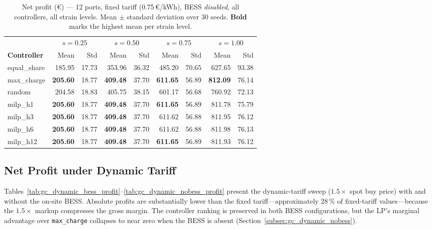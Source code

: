 \begin{table}[!htb]
\centering
\caption{Net profit (€) — 12 ports, fixed tariff (0.75\,€/kWh),
         BESS \emph{disabled}, all controllers, all strain levels.
         Mean $\pm$ standard deviation over 30 seeds.
         \textbf{Bold} marks the highest mean per strain level.}
\label{tab:gc_fixed_nobess_ms_12p}
\setlength{\tabcolsep}{4.5pt}
\begin{tabular}{l rr rr rr rr}
\toprule
 & \multicolumn{2}{c}{$s=0.25$}
 & \multicolumn{2}{c}{$s=0.50$}
 & \multicolumn{2}{c}{$s=0.75$}
 & \multicolumn{2}{c}{$s=1.00$} \\
\cmidrule(lr){2-3}\cmidrule(lr){4-5}\cmidrule(lr){6-7}\cmidrule(lr){8-9}
\textbf{Controller} & Mean & Std & Mean & Std & Mean & Std & Mean & Std \\
\midrule
equal\_share & 185.95 & 17.73 & 353.96 & 36.32 & 485.20 & 70.65 & 627.65 & 93.38 \\
max\_charge  & \textbf{205.60} & 18.77 & \textbf{409.48} & 37.70 & \textbf{611.65} & 56.89 & \textbf{812.09} & 76.14 \\
random       & 204.58 & 18.83 & 405.75 & 38.15 & 601.17 & 56.68 & 760.92 & 72.13 \\
milp\_h1     & \textbf{205.60} & 18.77 & \textbf{409.48} & 37.70 & \textbf{611.65} & 56.89 & 811.78 & 75.79 \\
milp\_h3     & \textbf{205.60} & 18.77 & \textbf{409.48} & 37.70 & 611.62 & 56.88 & 811.95 & 76.12 \\
milp\_h6     & \textbf{205.60} & 18.77 & \textbf{409.48} & 37.70 & 611.62 & 56.88 & 811.98 & 76.13 \\
milp\_h12    & \textbf{205.60} & 18.77 & \textbf{409.48} & 37.70 & \textbf{611.65} & 56.89 & 811.93 & 76.12 \\
\bottomrule
\end{tabular}
\end{table}

\subsection{Net Profit under Dynamic Tariff}
\label{subsec:gc_dynamic}

Tables~\ref{tab:gc_dynamic_bess_profit}--\ref{tab:gc_dynamic_nobess_profit}
present the dynamic-tariff sweep ($1.5\times$ spot buy price) with and without
the on-site BESS.  Absolute profits are substantially lower than the fixed
tariff—approximately 28\,\% of fixed-tariff values—because the $1.5\times$
markup compresses the gross margin.  The controller ranking is preserved in
both BESS configurations, but the LP's marginal advantage over
\texttt{max\_charge} collapses to near zero when the BESS is absent
(Section~\ref{subsec:gc_dynamic_nobess}).

